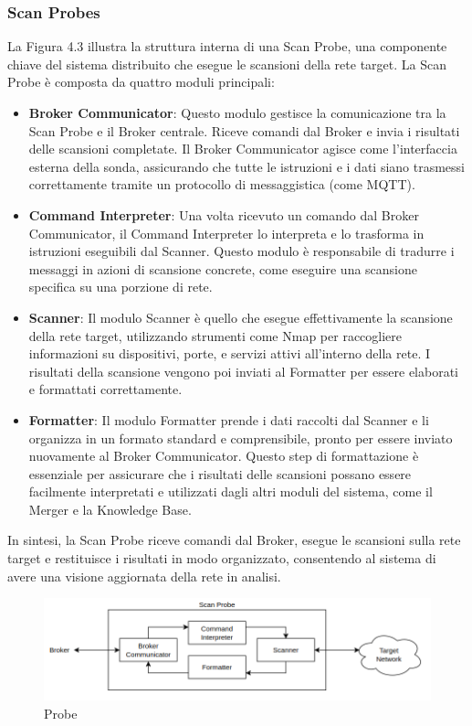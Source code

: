 \documentclass[target=bach,aauheader=,style=]{thud}
\begin{document}
\subsubsection{Scan Probes}
La Figura 4.3 illustra la struttura interna di una Scan Probe, una componente chiave del sistema distribuito che esegue le scansioni della rete target. La Scan Probe è composta da quattro moduli principali:
\begin{itemize}
  \item \textbf{Broker Communicator}: Questo modulo gestisce la comunicazione tra la Scan Probe e il Broker centrale. Riceve comandi dal Broker e invia i risultati delle scansioni completate. Il Broker Communicator agisce come l'interfaccia esterna della sonda, assicurando che tutte le istruzioni e i dati siano trasmessi correttamente tramite un protocollo di messaggistica (come MQTT).

  \item \textbf{Command Interpreter}: Una volta ricevuto un comando dal Broker Communicator, il Command Interpreter lo interpreta e lo trasforma in istruzioni eseguibili dal Scanner. Questo modulo è responsabile di tradurre i messaggi in azioni di scansione concrete, come eseguire una scansione specifica su una porzione di rete.

  \item \textbf{Scanner}: Il modulo Scanner è quello che esegue effettivamente la scansione della rete target, utilizzando strumenti come Nmap per raccogliere informazioni su dispositivi, porte, e servizi attivi all'interno della rete. I risultati della scansione vengono poi inviati al Formatter per essere elaborati e formattati correttamente.

  \item \textbf{Formatter}: Il modulo Formatter prende i dati raccolti dal Scanner e li organizza in un formato standard e comprensibile, pronto per essere inviato nuovamente al Broker Communicator. Questo step di formattazione è essenziale per assicurare che i risultati delle scansioni possano essere facilmente interpretati e utilizzati dagli altri moduli del sistema, come il Merger e la Knowledge Base.

\end{itemize}
In sintesi, la Scan Probe riceve comandi dal Broker, esegue le scansioni sulla rete target e restituisce i risultati in modo organizzato, consentendo al sistema di avere una visione aggiornata della rete in analisi.


\begin{figure}[t]
  \includegraphics[width=\columnwidth]{probe}
  \centering
  \caption{Probe}
  \label{probe}
\end{figure}
\FloatBarrier
\end{document}
